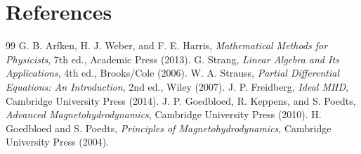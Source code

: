 \documentclass[11pt]{article}
\begin{document}
\section{References}
\begin{thebibliography}{99}
 G. B. Arfken, H. J. Weber, and F. E. Harris, \emph{Mathematical Methods for Physicists}, 7th ed., Academic Press (2013).
 G. Strang, \emph{Linear Algebra and Its Applications}, 4th ed., Brooks/Cole (2006).
 W. A. Strauss, \emph{Partial Differential Equations: An Introduction}, 2nd ed., Wiley (2007).
 J. P. Freidberg, \emph{Ideal MHD}, Cambridge University Press (2014).
 J. P. Goedbloed, R. Keppens, and S. Poedts, \emph{Advanced Magnetohydrodynamics}, Cambridge University Press (2010).
 H. Goedbloed and S. Poedts, \emph{Principles of Magnetohydrodynamics}, Cambridge University Press (2004).
\end{thebibliography}
\end{document}

